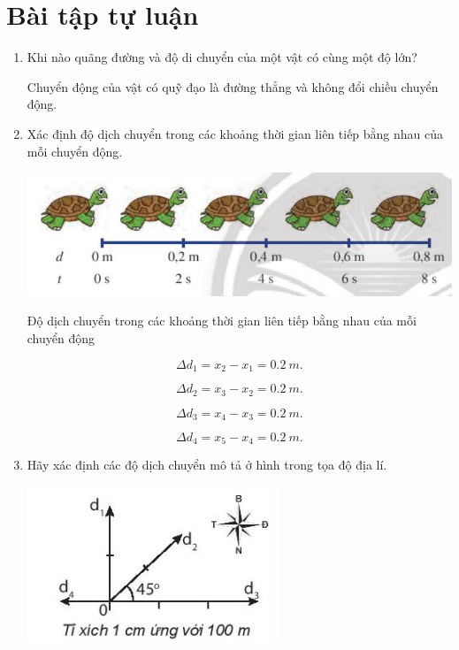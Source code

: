 \section{Bài tập tự luận}
\begin{enumerate}[label=\bfseries Bài \arabic*:,leftmargin=1.5cm]
	\item {}
	
	
	{
		Khi nào quãng đường và độ di chuyển của một vật có cùng một độ lớn?
	}
	
	\hideall
	{	Chuyển động của vật có quỹ đạo là đường thẳng và không đổi chiều chuyển động.
	}

	\item {}
	
	
	{
		Xác định độ dịch chuyển trong các khoảng thời gian liên tiếp bằng nhau của mỗi chuyển động.
		
		\begin{center}
			\includegraphics[scale=0.6]{../figs/VN10-2022-PH-TP004-6.jpg}
		\end{center}
	}
	
	\hideall
	{	
		
		Độ dịch chuyển trong các khoảng thời gian liên tiếp bằng nhau của mỗi chuyển động
		
		$$\Delta d_1 = x_2 - x_1 = \SI{0,2}{m}.$$
		
		$$\Delta d_2 = x_3 - x_2 = \SI{0,2}{m}.$$
		
		$$\Delta d_3 = x_4 - x_3 = \SI{0,2}{m}.$$
		
		$$\Delta d_4 = x_5 - x_4 = \SI{0,2}{m}.$$
		
	}


	\item {}
	
	
	{
		Hãy xác định các độ dịch chuyển mô tả ở hình trong tọa độ địa lí.
		
		\begin{center}
			\includegraphics[scale=1]{../figs/VN10-2022-PH-TP004-2.jpg}
		\end{center}
	}
	

\end{enumerate}
